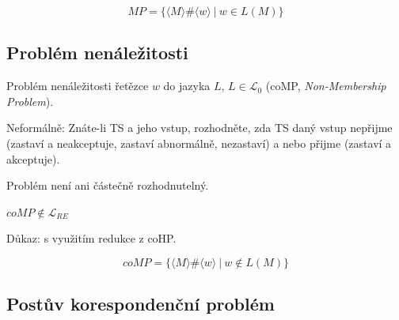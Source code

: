 $$ MP = \{ \langle M \rangle \# \langle w \rangle ~|~ w \in L(M) \} $$

\subsection*{Problém nenáležitosti}

\begin{compactitem}
    \item Problém nenáležitosti řetězce $w$ do jazyka $L$, $L \in \mathcal{L}_0$ (coMP, \textit{Non-Membership Problem}).

    \item Neformálně: Znáte-li TS a jeho vstup, rozhodněte, zda TS daný vstup nepřijme (zastaví a neakceptuje, zastaví abnormálně, nezastaví) a nebo přijme (zastaví a akceptuje).

    \item Problém není ani částečně rozhodnutelný. \begin{compactitem}
        \item $coMP \not\in \mathcal{L}_{RE}$
        \item Důkaz: s využitím redukce z coHP.
    \end{compactitem}

\end{compactitem}

$$ coMP = \{ \langle M \rangle \# \langle w \rangle ~|~ w \not\in L(M) \} $$

\subsection*{Postův korespondenční problém}

